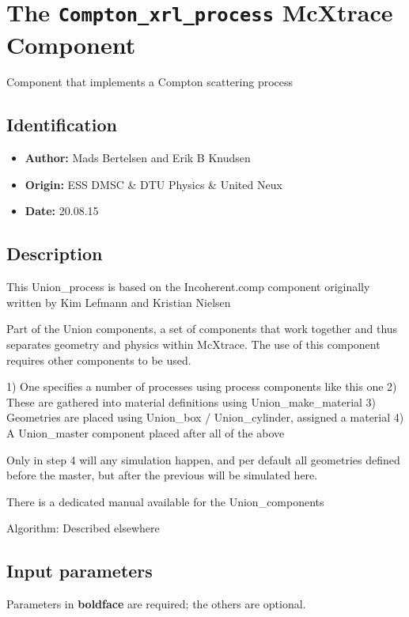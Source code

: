 \section{The \texttt{Compton\_xrl\_process} McXtrace Component}
Component that implements a Compton scattering process

\subsection*{Identification}
\begin{itemize}
  \item \textbf{Author:} Mads Bertelsen and Erik B Knudsen
  \item \textbf{Origin:} ESS DMSC \& DTU Physics \& United Neux
  \item \textbf{Date:} 20.08.15
\end{itemize}

\subsection*{Description}
This Union\_process is based on the Incoherent.comp component originally written by Kim Lefmann and Kristian Nielsen

Part of the Union components, a set of components that work together and thus separates geometry and physics within McXtrace. The use of this component requires other components to be used.

1) One specifies a number of processes using process components like this one 2) These are gathered into material definitions using Union\_make\_material 3) Geometries are placed using Union\_box / Union\_cylinder, assigned a material 4) A Union\_master component placed after all of the above

Only in step 4 will any simulation happen, and per default all geometries defined before the master, but after the previous will be simulated here.

There is a dedicated manual available for the Union\_components

Algorithm: Described elsewhere

\subsection*{Input parameters}
Parameters in \textbf{boldface} are required; the others are optional.

